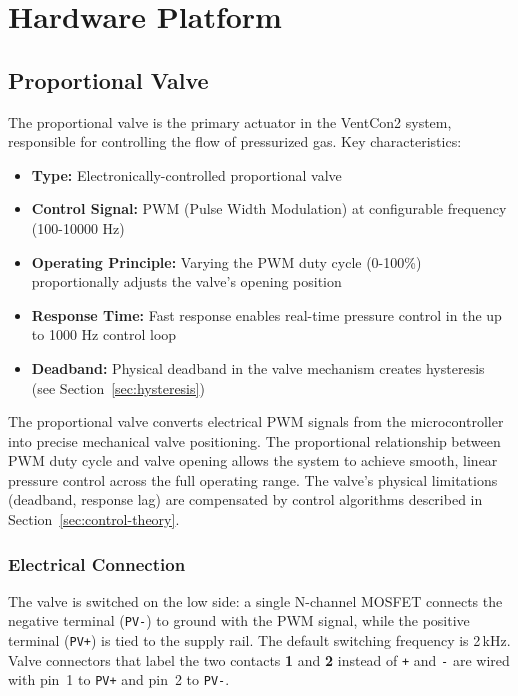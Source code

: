 
\section{Hardware Platform}

\subsection{Proportional Valve}

The proportional valve is the primary actuator in the VentCon2 system, responsible for controlling the flow of pressurized gas. Key characteristics:

    \begin{itemize}
        \item \textbf{Type:} Electronically-controlled proportional valve
        \item \textbf{Control Signal:} PWM (Pulse Width Modulation) at configurable frequency (100-10000 Hz)
        \item \textbf{Operating Principle:} Varying the PWM duty cycle (0-100\%) proportionally adjusts the valve's opening position
        \item \textbf{Response Time:} Fast response enables real-time pressure control in the up to 1000 Hz control loop
        \item \textbf{Deadband:} Physical deadband in the valve mechanism creates hysteresis (see Section~\ref{sec:hysteresis})
    \end{itemize}

The proportional valve converts electrical PWM signals from the microcontroller into precise mechanical valve positioning. The proportional relationship between PWM duty cycle and valve opening allows the system to achieve smooth, linear pressure control across the full operating range. The valve's physical limitations (deadband, response lag) are compensated by control algorithms described in Section~\ref{sec:control-theory}.

\subsubsection{Electrical Connection}

The valve is switched on the low side: a single N-channel MOSFET connects the negative terminal (\texttt{PV-}) to ground with the PWM signal, while the positive terminal (\texttt{PV+}) is tied to the supply rail. The default switching frequency is 2\,kHz. Valve connectors that label the two contacts \textbf{1} and \textbf{2} instead of \texttt{+} and \texttt{-} are wired with pin~1 to \texttt{PV+} and pin~2 to \texttt{PV-}.

